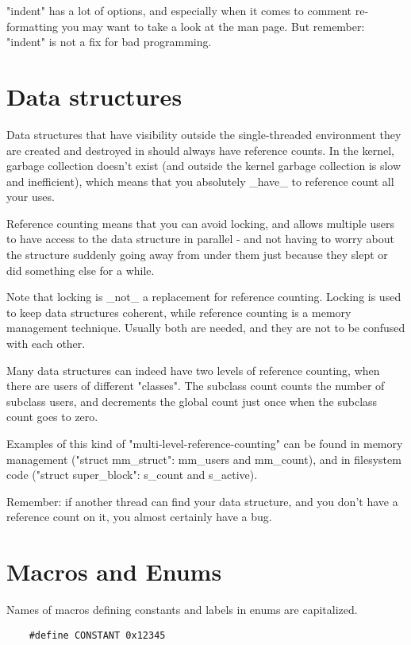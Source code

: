 \documentclass[pdftex,12pt, twocol]{article} %
\begin{document}
"indent" has a lot of options, and especially when it comes to comment
re-formatting you may want to take a look at the man page.  But
remember: "indent" is not a fix for bad programming.

\section{Data structures}

Data structures that have visibility outside the single-threaded
environment they are created and destroyed in should always have
reference counts.  In the kernel, garbage collection doesn't exist (and
outside the kernel garbage collection is slow and inefficient), which
means that you absolutely \_have\_ to reference count all your uses.

Reference counting means that you can avoid locking, and allows multiple
users to have access to the data structure in parallel - and not having
to worry about the structure suddenly going away from under them just
because they slept or did something else for a while.

Note that locking is \_not\_ a replacement for reference counting.
Locking is used to keep data structures coherent, while reference
counting is a memory management technique.  Usually both are needed, and
they are not to be confused with each other.

Many data structures can indeed have two levels of reference counting,
when there are users of different "classes".  The subclass count counts
the number of subclass users, and decrements the global count just once
when the subclass count goes to zero.

Examples of this kind of "multi-level-reference-counting" can be found in
memory management ("struct mm\_struct": mm\_users and mm\_count), and in
filesystem code ("struct super\_block": s\_count and s\_active).

Remember: if another thread can find your data structure, and you don't
have a reference count on it, you almost certainly have a bug.


\section{Macros and Enums}

Names of macros defining constants and labels in enums are capitalized.

\begin{verbatim}
	#define CONSTANT 0x12345
\end{verbatim}
\end{document}
